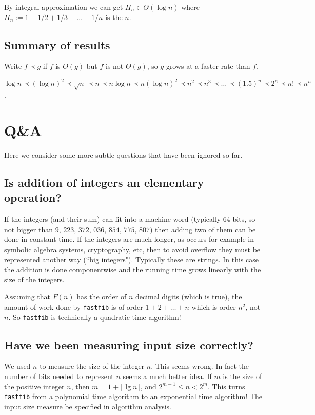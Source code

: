 \begin{Boxample} 
By integral approximation we can get $H_n \in \Theta(\log n)$ where 
$H_n:=1+ 1/2 + 1/3 + \dots + 1/n$ is the $n$. 
\end{Boxample}

\section{Summary of results}
Write $f \prec g$ if $f$ is $O(g)$ but $f$ is not $\Theta(g)$, so $g$ grows at a  faster rate than $f$. 
\begin{Boxample}
$\log n \prec (\log n)^2 \prec \sqrt{n} \prec n \prec n \log n 
 \prec n (\log n)^2 \prec n^2 
\prec n^3 \prec \dots \prec (1.5)^n \prec 2^n \prec n! \prec n^n$.
\end{Boxample}


\chapter{Q\&A} %
Here we consider some more subtle questions that have been ignored so far.

\section{Is addition of integers an elementary operation?}
If the integers (and their sum) can fit into a machine word (typically 64 bits, so not bigger than $9$, $223$, $372$, $036$, $854$, $775$, $807$) then 
adding two of them can be done in constant time. 
If the integers are much longer, as occurs for example in symbolic algebra systems, cryptography, etc, 
then to avoid overflow they must be represented another way (``big integers"). Typically these are strings. 
In this case the addition is done componentwise and the running time grows linearly with the size of the integers. 

\begin{Boxample}
Assuming that $F(n)$ has the order of $n$ decimal digits (which is true), the amount of work 
done by \texttt{fastfib} is of order $1+2+\dots + n$ which is order $n^2$, not $n$. 
So \texttt{fastfib} is technically a quadratic time algorithm!
\end{Boxample}

\section{Have we been measuring input size correctly?}
We used $n$ to measure the size of the integer $n$. This seems wrong. 
In fact the number of bits needed to represent $n$ seems a much better idea. 
If $m$ is the size of the positive integer $n$, then $m = 1+\lfloor\lg n\rfloor$, and $2^{m-1} \leq n < 2^m$.
This turns \texttt{fastfib} from a polynomial time algorithm to an exponential time algorithm! 
The input size measure  be specified in algorithm analysis.

